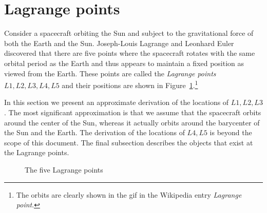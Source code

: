 
\section{Lagrange points}\label{s.lagrange}

Consider a spacecraft orbiting the Sun and subject to the gravitational force of both the Earth and the Sun. Joseph-Louis Lagrange and Leonhard Euler discovered that there are five points where the spacecraft rotates with the same orbital period as the Earth and thus appears to maintain a fixed position as viewed from the Earth. These points are called the \emph{Lagrange points} $L1, L2, L3, L4, L5$ and their positions are shown in Figure~\ref{f.lagrangepoints}.\footnote{The orbits are clearly shown in the gif in the Wikipedia entry \emph{Lagrange point}.}

In this section we present an approximate derivation of the locations of $L1, L2, L3$. The most significant approximation is that we assume that the spacecraft orbits around the center of the Sun, whereas it actually orbits around the barycenter of the Sun and the Earth. The derivation of the locations of $L4, L5$ is beyond the scope of this document. The final subsection describes the objects that exist at the Lagrange points.

\begin{figure}[b]
\begin{center}
\end{center}
\caption{The five Lagrange points}\label{f.lagrangepoints}
\end{figure}

